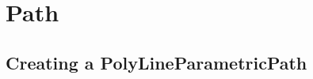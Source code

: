 %



%



%



%



%



%




\section{Path}\label{PathSection}

\subsection{Creating a PolyLineParametricPath}
\label{sec:CreatingAPolyLineParametricPath}



%



